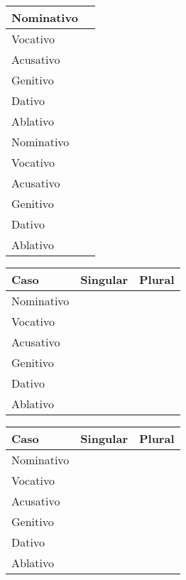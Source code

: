 \documentclass[12pt, twocolumn, a4paper, article]{article}
\numberwithin{equation}{section}
\begin{document}
\begin{table}
\centering
\begin{tabular}[!ht]{|l|p{3cm}|} %
\hline \hline
Nominativo &  \\ \hline
Vocativo   &  \\ \hline
Acusativo  &  \\ \hline
Genitivo   &  \\ \hline
Dativo     &  \\ \hline
Ablativo   &  \\
\hline
\hline
Nominativo &  \\ \hline
Vocativo   &  \\ \hline
Acusativo  &  \\ \hline
Genitivo   &  \\ \hline
Dativo     &  \\ \hline
Ablativo   &  \\
\hline \hline
\end{tabular}
\end{table}

\clearpage

\begin{table}
\centering
\begin{tabular}[!ht]{|l|p{2.5cm}|p{2.5cm}|} 
\hline \hline
Caso & \multicolumn{1}{c|}{Singular} & \multicolumn{1}{c|}{Plural}  \\
\hline
Nominativo &  & \\ \hline
Vocativo   &  & \\ \hline
Acusativo  &  & \\ \hline
Genitivo   &  & \\ \hline
Dativo     &  & \\ \hline
Ablativo   &  & \\
\hline \hline
\end{tabular}
\end{table}

\begin{table}
\centering
\begin{tabular}[!ht]{|l|p{2.5cm}|p{2.5cm}|} 
\hline \hline
Caso & \multicolumn{1}{c|}{Singular} & \multicolumn{1}{c|}{Plural}  \\
\hline
Nominativo &  & \\ \hline
Vocativo   &  & \\ \hline
Acusativo  &  & \\ \hline
Genitivo   &  & \\ \hline
Dativo     &  & \\ \hline
Ablativo   &  & \\
\hline \hline
\end{tabular}
\end{table}
\end{document}
